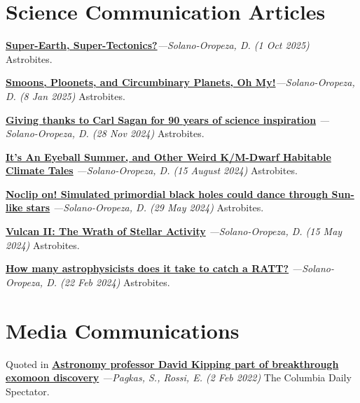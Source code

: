 \documentclass[a4paper,11pt]{article}
\begin{document}
\section{Science Communication Articles}

    \href{Super-Earth, Super-Tectonics?}{{\textbf{Super-Earth, Super-Tectonics?}}}\textit{—Solano-Oropeza, D. (1 Oct 2025)} Astrobites.
    \vspace{1.5mm}
    
    {\href{https://astrobites.org/2025/01/08/smoons-ploonets-and-circumbinary-planets-oh-my/}{\textbf{Smoons, Ploonets, and Circumbinary Planets, Oh My!}}}\textit{—Solano-Oropeza, D. (8 Jan 2025)} Astrobites.
    \vspace{1.5mm}

    {\href{https://astrobites.org/2024/11/28/giving-thanks-to-carl-sagan-for-90-years-of-science-inspiration/} {\textbf{Giving thanks to Carl Sagan for 90 years of science inspiration}}} \textit{—Solano-Oropeza, D. (28 Nov 2024)} Astrobites.
    \vspace{1.5mm}

    {\href{https://astrobites.org/2024/08/15/its-an-eyeball-summer-and-other-weird-k-m-dwarf-habitable-climate-tales/}{\textbf{It’s An Eyeball Summer, and Other Weird K/M-Dwarf Habitable Climate Tales}}} \textit{—Solano-Oropeza, D. (15 August 2024)} Astrobites.
    \vspace{1.5mm}


    {\href{https://astrobites.org/2024/05/29/noclip-on-simulated-primordial-black-holes-could-dance-through-sun-like-stars/}{\textbf{Noclip on! Simulated primordial black holes could dance through Sun-like stars}}} \textit{—Solano-Oropeza, D. (29 May 2024)} Astrobites.
    \vspace{1.5mm}

    {\href{https://astrobites.org/2024/02/22/how-many-astrophysicists-does-it-take-to-catch-a-ratt/}{\textbf{Vulcan II: The Wrath of Stellar Activity}}} \textit{—Solano-Oropeza, D. (15 May 2024)} Astrobites.
    \vspace{1.5mm}

    {\href{https://astrobites.org/2024/02/22/how-many-astrophysicists-does-it-take-to-catch-a-ratt/}{\textbf{How many astrophysicists does it take to catch a RATT?}}} \textit{—Solano-Oropeza, D. (22 Feb 2024)} Astrobites.
    \vspace{1.5mm}
    
\section{Media Communications}
    Quoted in {\href{https://www.columbiaspectator.com/news/2022/02/02/astronomy-professor-david-kipping-part-of-breakthrough-exomoon-discovery/}{\textbf{Astronomy professor David Kipping part of breakthrough exomoon discovery}}} \textit{—Pagkas, S., Rossi, E. (2 Feb 2022)} The Columbia Daily Spectator.
\end{document}
